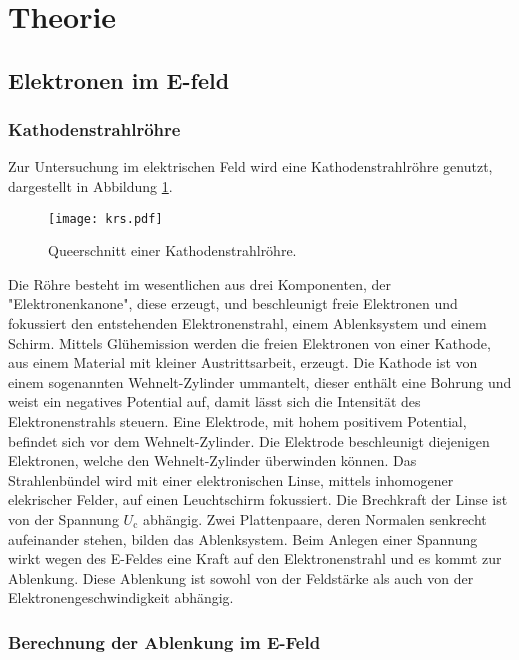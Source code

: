 \section{Theorie}
\label{sec:Theorie}
\subsection{Elektronen im E-feld}
\subsubsection{Kathodenstrahlröhre}
Zur Untersuchung im elektrischen Feld wird eine Kathodenstrahlröhre genutzt,
dargestellt in Abbildung \ref{fig:krs}.
\begin{figure}
 \centering
 \texttt{[image: krs.pdf]}
 \caption{Queerschnitt einer Kathodenstrahlröhre.}
 \label{fig:krs}
\end{figure}
Die Röhre besteht im wesentlichen aus drei Komponenten, der "Elektronenkanone",
diese erzeugt, und beschleunigt freie Elektronen und
fokussiert den entstehenden Elektronenstrahl, einem Ablenksystem und einem Schirm.
Mittels Glühemission werden die freien Elektronen von einer Kathode, aus
einem Material mit kleiner Austrittsarbeit, erzeugt.
Die Kathode ist von einem sogenannten Wehnelt-Zylinder ummantelt, dieser enthält
eine Bohrung und weist ein negatives Potential auf, damit lässt sich die
Intensität des Elektronenstrahls steuern.
Eine Elektrode, mit hohem positivem Potential, befindet sich
vor dem Wehnelt-Zylinder. Die Elektrode beschleunigt diejenigen Elektronen,
welche den Wehnelt-Zylinder überwinden können.
Das Strahlenbündel wird mit einer elektronischen Linse, mittels
inhomogener elekrischer Felder, auf einen Leuchtschirm fokussiert.
Die Brechkraft der Linse ist von der Spannung $U_\mathrm{c}$ abhängig.
Zwei Plattenpaare, deren Normalen senkrecht aufeinander stehen, bilden
das Ablenksystem. Beim Anlegen einer Spannung wirkt wegen des E-Feldes
eine Kraft auf den Elektronenstrahl und es kommt zur Ablenkung.
Diese Ablenkung ist sowohl von der Feldstärke als auch von der
Elektronengeschwindigkeit abhängig.

\subsubsection{Berechnung der Ablenkung im E-Feld}

